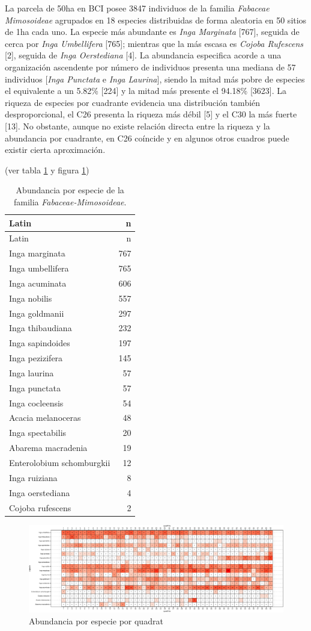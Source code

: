 \documentclass[11pt,]{article}
\begin{document}
La parcela de 50ha en BCI posee 3847 individuos de la familia
\emph{Fabaceae Mimosoideae} agrupados en 18 especies distribuidas de
forma aleatoria en 50 sitios de 1ha cada uno. La especie más abundante
es \emph{Inga Marginata} {[}767{]}, seguida de cerca por \emph{Inga
Umbellifera} {[}765{]}; mientras que la más escasa es \emph{Cojoba
Rufescens} {[}2{]}, seguida de \emph{Inga Oerstediana} {[}4{]}. La
abundancia especifica acorde a una organización ascendente por número de
individuos presenta una mediana de 57 individuos {[}\emph{Inga Punctata}
e \emph{Inga Laurina}{]}, siendo la mitad más pobre de especies el
equivalente a un 5.82\% {[}224{]} y la mitad más presente el 94.18\%
{[}3623{]}. La riqueza de especies por cuadrante evidencia una
distribución también desproporcional, el C26 presenta la riqueza más
débil {[}5{]} y el C30 la más fuerte {[}13{]}. No obstante, aunque no
existe relación directa entre la riqueza y la abundancia por cuadrante,
en C26 coíncide y en algunos otros cuadros puede existir cierta
aproximación.

(ver tabla \ref{tab:abun_sp} y figura \ref{fig:abun_sp_q})

\begin{longtable}[]{@{}lr@{}}
\caption{\label{tab:abun_sp}Abundancia por especie de la familia
\emph{Fabaceae-Mimosoideae}.}\tabularnewline
\toprule
Latin & n\tabularnewline
\midrule
\endfirsthead
\toprule
Latin & n\tabularnewline
\midrule
\endhead
Inga marginata & 767\tabularnewline
Inga umbellifera & 765\tabularnewline
Inga acuminata & 606\tabularnewline
Inga nobilis & 557\tabularnewline
Inga goldmanii & 297\tabularnewline
Inga thibaudiana & 232\tabularnewline
Inga sapindoides & 197\tabularnewline
Inga pezizifera & 145\tabularnewline
Inga laurina & 57\tabularnewline
Inga punctata & 57\tabularnewline
Inga cocleensis & 54\tabularnewline
Acacia melanoceras & 48\tabularnewline
Inga spectabilis & 20\tabularnewline
Abarema macradenia & 19\tabularnewline
Enterolobium schomburgkii & 12\tabularnewline
Inga ruiziana & 8\tabularnewline
Inga oerstediana & 4\tabularnewline
Cojoba rufescens & 2\tabularnewline
\bottomrule
\end{longtable}

\begin{figure}
\centering
\includegraphics{manuscrito_files/figure-latex/unnamed-chunk-3-1.pdf}
\caption{\label{fig:abun_sp_q}Abundancia por especie por quadrat}
\end{figure}
\end{document}
